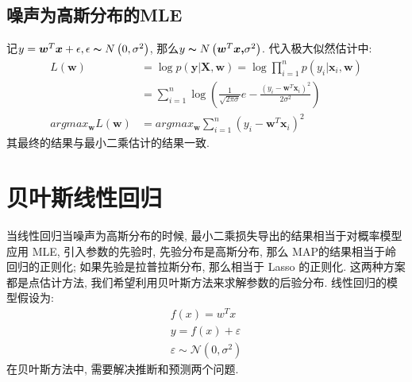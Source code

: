\subsection{噪声为高斯分布的MLE}
记$y=\boldsymbol{w}^T\boldsymbol{x}+\epsilon ,\epsilon \thicksim N\left( 0,\sigma ^2 \right) $, 那么$y\thicksim N\left( \boldsymbol{w}^T\boldsymbol{x,}\sigma ^2 \right) $. 代入极大似然估计中:
\begin{equation}
\begin{aligned}
L\left( \boldsymbol{w} \right) &=\log p\left( \mathbf{y}\left| \mathbf{X},\boldsymbol{w} \right. \right) =\log \prod_{i=1}^n{p\left( y_i\left| \boldsymbol{x}_i,\boldsymbol{w} \right. \right)}\\
&=\sum_{i=1}^n{\log \left( \frac{1}{\sqrt{2\pi \sigma}}e-\frac{\left( y_i-\boldsymbol{w}^T\boldsymbol{x}_i \right) ^2}{2\sigma ^2} \right)}\\
argmax_{\boldsymbol{w}}L\left( \boldsymbol{w} \right) &=argmax_{\boldsymbol{w}}\sum_{i=1}^n{\left( y_i-\boldsymbol{w}^T\boldsymbol{x}_i \right) ^2}
\end{aligned}
\end{equation}
其最终的结果与最小二乘估计的结果一致. 
\section{贝叶斯线性回归}
当线性回归当噪声为高斯分布的时候, 最小二乘损失导出的结果相当于对概率模型应用 MLE, 引入参数的先验时, 先验分布是高斯分布, 那么 MAP的结果相当于岭回归的正则化; 如果先验是拉普拉斯分布, 那么相当于 Lasso 的正则化. 这两种方案都是点估计方法, 我们希望利用贝叶斯方法来求解参数的后验分布. 线性回归的模型假设为:
\begin{equation}
\begin{array}{c}
f(x)=w^{T} x \\
y=f(x)+\varepsilon \\
\varepsilon \sim \mathcal{N}\left(0, \sigma^{2}\right)
\end{array}
\end{equation}
在贝叶斯方法中, 需要解决推断和预测两个问题. 
